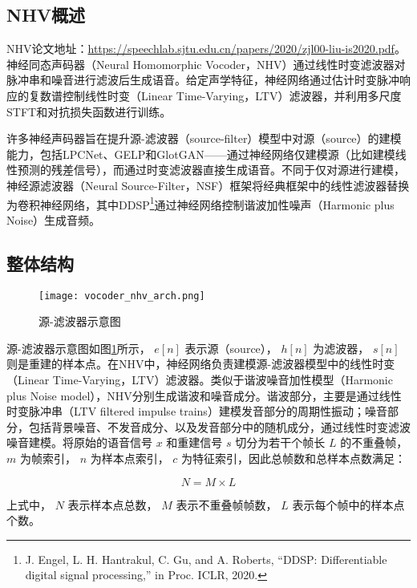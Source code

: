 \documentclass[cn,10pt,math=newtx,citestyle=gb7714-2015,bibstyle=gb7714-2015]{elegantbook}
\begin{document}
\subsection{NHV概述}

NHV论文地址：\href{Neural Homomorphic Vocoder}{https://speechlab.sjtu.edu.cn/papers/2020/zjl00-liu-is2020.pdf}。神经同态声码器（Neural Homomorphic Vocoder，NHV）通过线性时变滤波器对脉冲串和噪音进行滤波后生成语音。给定声学特征，神经网络通过估计时变脉冲响应的复数谱控制线性时变（Linear Time-Varying，LTV）滤波器，并利用多尺度STFT和对抗损失函数进行训练。

许多神经声码器旨在提升源-滤波器（source-filter）模型中对源（source）的建模能力，包括LPCNet、GELP和GlotGAN——通过神经网络仅建模源（比如建模线性预测的残差信号），而通过时变滤波器直接生成语音。不同于仅对源进行建模，神经源滤波器（Neural Source-Filter，NSF）框架将经典框架中的线性滤波器替换为卷积神经网络，其中DDSP\footnote{J. Engel, L. H. Hantrakul, C. Gu, and A. Roberts, “DDSP:
Differentiable digital signal processing,” in Proc. ICLR, 2020.}通过神经网络控制谐波加性噪声（Harmonic plus Noise）生成音频。

\subsection{整体结构}

\begin{figure}[htbp]
  \centering
  \texttt{[image: vocoder\_nhv\_arch.png]}
  \caption{源-滤波器示意图 \label{fig:vocoder_nhv_arch}}
\end{figure}

源-滤波器示意图如图\ref{fig:vocoder_nhv_arch}所示， ${e[n]}$ 表示源（source）， $h[n]$ 为滤波器， $s[n]$ 则是重建的样本点。在NHV中，神经网络负责建模源-滤波器模型中的线性时变（Linear Time-Varying，LTV）滤波器。类似于谐波噪音加性模型（Harmonic plus Noise model），NHV分别生成谐波和噪音成分。谐波部分，主要是通过线性时变脉冲串（LTV filtered impulse trains）建模发音部分的周期性振动；噪音部分，包括背景噪音、不发音成分、以及发音部分中的随机成分，通过线性时变滤波噪音建模。将原始的语音信号 $x$ 和重建信号 $s$ 切分为若干个帧长 $L$ 的不重叠帧， $m$ 为帧索引， $n$ 为样本点索引， $c$ 为特征索引，因此总帧数和总样本点数满足：

\begin{equation}
  N=M\times L
\end{equation}

上式中， $N$ 表示样本点总数， $M$ 表示不重叠帧帧数，  $L$ 表示每个帧中的样本点个数。
\end{document}
